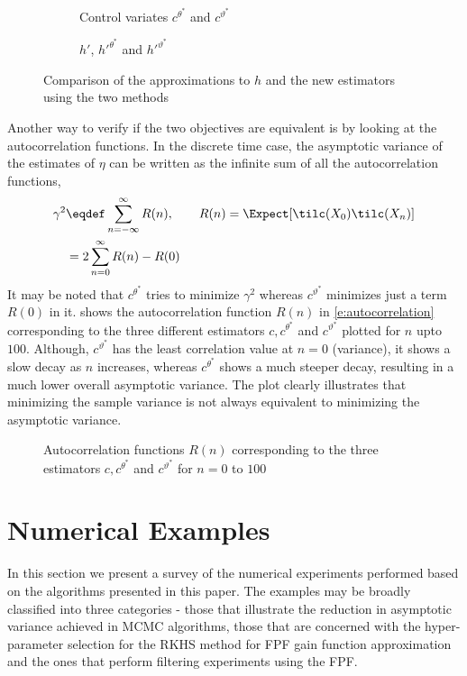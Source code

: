 \begin{figure}[h]
	\centering
	\begin{subfigure}{0.45\textwidth}
		\caption{Control variates $c^{\theta^*}$ and $c^{\vartheta^*}$}
		\label{cv_theta_var}
	\end{subfigure}
	\hfill
	\begin{subfigure}{0.45\textwidth}
		\caption{$h'$, $h'^{\theta^*}$ and $h'^{\vartheta^*}$}
		\label{h_theta_var}
	\end{subfigure}
	\caption{Comparison of the approximations to $h$ and the new estimators using the two methods}
	\label{theta_vartheta}
\end{figure}


Another way to verify if the two objectives are equivalent is by looking at the autocorrelation functions. In the discrete time case, the asymptotic variance of the estimates of $\eta$ can be written as the infinite sum of all the autocorrelation functions,
\begin{equation}
\begin{aligned}
\gamma^2  & \eqdef \sum_{n=-\infty}^\infty R(n), \qquad R(n) = \Expect [\tilc(X_0) \tilc(X_n)] \\
& = 2 \sum_{n=0}^\infty R(n)- R(0)
\end{aligned}
\label{e:autocorrelation}
\end{equation}
It may be noted that $c^{\theta^*}$ tries to minimize $\gamma^2$ whereas $c^{\vartheta^*}$ minimizes just a term $R(0)$ in it.  shows the autocorrelation function $R(n)$ in \eqref{e:autocorrelation} corresponding to the three different estimators $c,c^{\theta^*}$  and $c^{\vartheta^*}$ plotted for $n$ upto $100$. Although, $c^{\vartheta^{*}}$ has the least correlation value at $n=0$ (variance), it shows a slow decay as $n$ increases, whereas $c^{\theta^*}$ shows a much steeper decay, resulting in a much lower overall asymptotic variance. The plot clearly illustrates that minimizing the sample variance is not always equivalent to minimizing the asymptotic variance.

\begin{figure}[h]
	\caption{ Autocorrelation functions $R(n)$ corresponding to the three estimators $c, c^{\theta^*}$ and $c^{\vartheta^*}$  for $n= 0$ to $100$  }
	\label{auto_correlation}
\end{figure}


\section{Numerical Examples}
\label{s:numerics}
In this section we present a survey of the numerical experiments performed based on the algorithms presented in this paper. The examples may be broadly classified into three categories - those that illustrate the reduction in asymptotic variance achieved in MCMC algorithms, those that are concerned with the hyper-parameter selection for the RKHS method for FPF gain function approximation and the ones that perform filtering experiments using the FPF.

